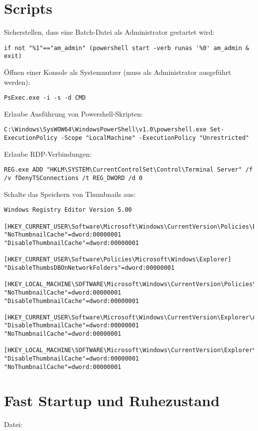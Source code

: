 \section{Scripts}
Sicherstellen, dass eine Batch-Datei als Administrator gestartet wird:
\begin{lstlisting}
if not "%1"=="am_admin" (powershell start -verb runas '%0' am_admin & exit)
\end{lstlisting}
Öffnen einer Konsole als Systemnutzer (muss als Administrator ausgeführt werden):
\begin{lstlisting}
PsExec.exe -i -s -d CMD
\end{lstlisting}
Erlaube Ausführung von Powershell-Skripten:
\begin{lstlisting}
C:\Windows\SysWOW64\WindowsPowerShell\v1.0\powershell.exe Set-ExecutionPolicy -Scope "LocalMachine" -ExecutionPolicy "Unrestricted"
\end{lstlisting}
Erlaube RDP-Verbindungen:
\begin{lstlisting}
REG.exe ADD "HKLM\SYSTEM\CurrentControlSet\Control\Terminal Server" /f /v fDenyTSConnections /t REG_DWORD /d 0
\end{lstlisting}
Schalte das Speichern von Thumbnails aus:
\begin{lstlisting}
Windows Registry Editor Version 5.00

[HKEY_CURRENT_USER\Software\Microsoft\Windows\CurrentVersion\Policies\Explorer]
"NoThumbnailCache"=dword:00000001
"DisableThumbnailCache"=dword:00000001

[HKEY_CURRENT_USER\Software\Policies\Microsoft\Windows\Explorer]
"DisableThumbsDBOnNetworkFolders"=dword:00000001

[HKEY_LOCAL_MACHINE\SOFTWARE\Microsoft\Windows\CurrentVersion\Policies\Explorer]
"NoThumbnailCache"=dword:00000001
"DisableThumbnailCache"=dword:00000001

[HKEY_CURRENT_USER\Software\Microsoft\Windows\CurrentVersion\Explorer\Advanced]
"DisableThumbnailCache"=dword:00000001
"NoThumbnailCache"=dword:00000001

[HKEY_LOCAL_MACHINE\SOFTWARE\Microsoft\Windows\CurrentVersion\Explorer\Advanced]
"DisableThumbnailCache"=dword:00000001
"NoThumbnailCache"=dword:00000001
\end{lstlisting}

\section{Fast Startup und Ruhezustand}
Datei: 
